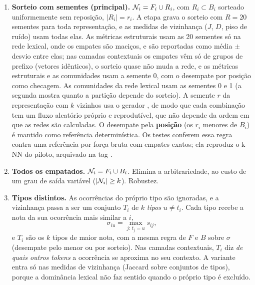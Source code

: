 \begin{enumerate}[label=(\alph*)]
    \item \textbf{Sorteio com sementes (principal).} $\mathcal{N}_i=F_i\cup R_i$, com $R_i\subset B_i$
    sorteado uniformemente sem reposição, $|R_i|=r_i$. A etapa  grava o sorteio com
    $R=20$ sementes para toda representação, e as medidas de vizinhança ($J$, $D$, piso de
    ruído) usam todas elas. As métricas estruturais usam as 20 sementes só na rede lexical, onde
    os empates são maciços, e são reportadas como média $\pm$ desvio entre elas; nas camadas
    contextuais os empates vêm só de grupos de prefixo (vetores idênticos), o sorteio quase não
    muda a rede, e as métricas estruturais e as comunidades usam a semente 0, com o desempate
    por posição como checagem. As comunidades da rede lexical usam as sementes 0 e 1 (a segunda
    mostra quanto a partição depende do sorteio). A semente $r$ da
    representação  com $k$ vizinhos usa o gerador
    , de modo que cada combinação tem um fluxo
    aleatório próprio e reprodutível, que não depende da ordem em que as redes são calculadas.
    O desempate pela \textbf{posição} (os $r_i$ menores  de $B_i$) é mantido
    como referência determinística. Os testes conferem essa regra contra uma referência por
    força bruta com empates exatos; ela reproduz o k-NN do piloto, arquivado na tag
    .
    \item \textbf{Todos os empatados.} $\mathcal{N}_i=F_i\cup B_i$. Elimina a arbitrariedade, ao custo de
    um grau de saída variável ($|\mathcal{N}_i|\ge k$). Robustez.
    \item \textbf{Tipos distintos.} As ocorrências do próprio tipo são ignoradas, e a vizinhança
    passa a ser um conjunto $T_i$ de $k$ \emph{tipos} $u\neq t_i$. Cada tipo recebe a nota da
    sua ocorrência mais similar a $i$,
    \begin{equation}
        \sigma_{iu} = \max_{j:\,t_j=u} s_{ij},
    \end{equation}
    e $T_i$ são os $k$ tipos de maior nota, com a mesma regra de $F$ e $B$ sobre $\sigma$
    (desempate pelo menor  ou por sorteio). Nas camadas contextuais, $T_i$ diz
    \emph{de quais outros tokens} a ocorrência se aproxima no seu contexto. A variante entra só
    nas medidas de vizinhança (Jaccard sobre conjuntos de tipos), porque a dominância lexical
    não faz sentido quando o próprio tipo é excluído.
\end{enumerate}

